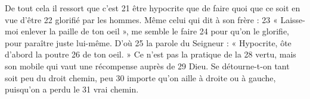 De tout cela il ressort que c'est	 
21	 	être hypocrite que de faire quoi que ce soit en vue d'être	 
22	 	glorifié par les hommes. Même celui qui dit à son frère :	 
23	 	« Laisse-moi enlever la paille de ton oeil », me semble le faire	 
24	 	pour qu'on le glorifie, pour paraître juste lui-même. D'où	 
25	 	la parole du Seigneur : « Hypocrite, ôte d'abord la poutre	 
26	 	de ton oeil. » Ce n'est pas la pratique de la	 
28	 	vertu, mais son mobile qui vaut une récompense auprès de	 
29	 	Dieu. Se détourne-t-on tant soit peu du droit chemin, peu	 
30	 	importe qu'on aille à droite ou à gauche, puisqu'on a perdu le	 
31	 	vrai chemin.